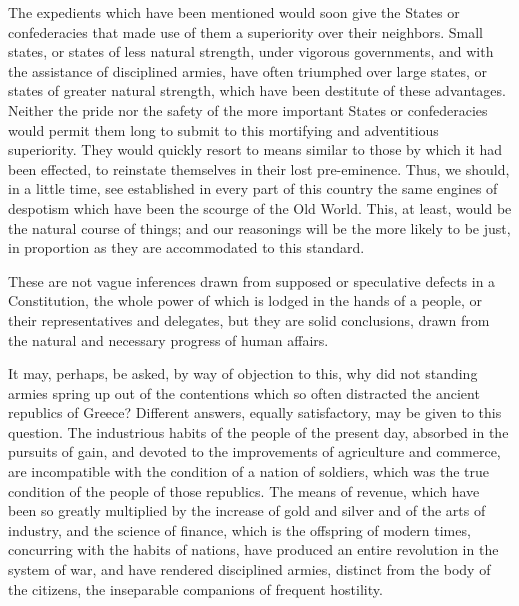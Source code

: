 The expedients which have been mentioned would soon give the States or confederacies that made use of them a superiority over their neighbors. 
Small states, or states of less natural strength, under vigorous governments, and with the assistance of disciplined armies, have often triumphed over large states, or states of greater natural strength, which have been destitute of these advantages. 
Neither the pride nor the safety of the more important States or confederacies would permit them long to submit to this mortifying and adventitious superiority. 
They would quickly resort to means similar to those by which it had been effected, to reinstate themselves in their lost pre-eminence. 
Thus, we should, in a little time, see established in every part of this country the same engines of despotism which have been the scourge of the Old World. 
This, at least, would be the natural course of things; and our reasonings will be the more likely to be just, in proportion as they are accommodated to this standard.

These are not vague inferences drawn from supposed or speculative defects in a Constitution, the whole power of which is lodged in the hands of a people, or their representatives and delegates, but they are solid conclusions, drawn from the natural and necessary progress of human affairs.

It may, perhaps, be asked, by way of objection to this, why did not standing armies spring up out of the contentions which so often distracted the ancient republics of Greece? 
Different answers, equally satisfactory, may be given to this question. 
The industrious habits of the people of the present day, absorbed in the pursuits of gain, and devoted to the improvements of agriculture and commerce, are incompatible with the condition of a nation of soldiers, which was the true condition of the people of those republics. 
The means of revenue, which have been so greatly multiplied by the increase of gold and silver and of the arts of industry, and the science of finance, which is the offspring of modern times, concurring with the habits of nations, have produced an entire revolution in the system of war, and have rendered disciplined armies, distinct from the body of the citizens, the inseparable companions of frequent hostility.

